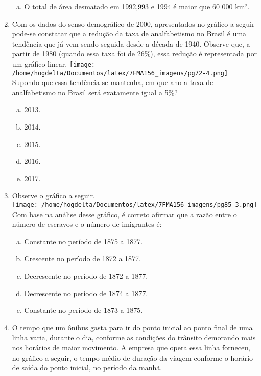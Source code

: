 \documentclass[a4paper,14pt]{article}
\begin{document}
\begin{multicols}{2}
\begin{enumerate}
\begin{enumerate}[a)]
		    	\item O total de área desmatado em 1992,993 e 1994 é maior que 60 000 km².
		    \end{enumerate}
			\item Com os dados do senso demográfico de 2000, apresentados no gráfico a seguir pode-se constatar que a redução da taxa de analfabetismo no Brasil é uma tendência que já vem sendo seguida desde a década de 1940. Observe que, a partir de 1980 (quando essa taxa foi de 26\%), essa redução é representada por um gráfico linear.
			\texttt{[image: /home/hogdelta/Documentos/latex/7FMA156\_imagens/pg72-4.png]} \\
			Supondo que essa tendência se mantenha, em que ano a taxa de analfabetismo no Brasil será exatamente igual a 5\%?
			\begin{enumerate}[a)]
				\item 2013. 
				\item 2014. 
				\item 2015. 
				\item 2016. 
				\item 2017.
			\end{enumerate}
		    \item Observe o gráfico a seguir. \\
		    \texttt{[image: /home/hogdelta/Documentos/latex/7FMA156\_imagens/pg85-3.png]} \\
		    Com base na análise desse gráfico, é correto afirmar que a razão entre o número de escravos e o número de imigrantes é:
		    \begin{enumerate}[a)]
		    	\item Constante no período de 1875 a 1877.
		    	\item Crescente no período de 1872 a 1877.
		    	\item Decrescente no período de 1872 a 1877.
		    	\item Decrescente no período de 1874 a 1877.
		    	\item Constante no período de 1873 a 1875.
		    \end{enumerate}
	        \item O tempo que um ônibus gasta para ir do ponto inicial ao ponto final de uma linha varia, durante o dia, conforme as condições do trânsito demorando mais nos horários de maior movimento. A empresa que opera essa linha forneceu, no gráfico a seguir, o tempo médio de duração da viagem conforme o horário de saída do ponto inicial, no período da manhã. \\

\end{enumerate}
\end{multicols}
\end{document}
